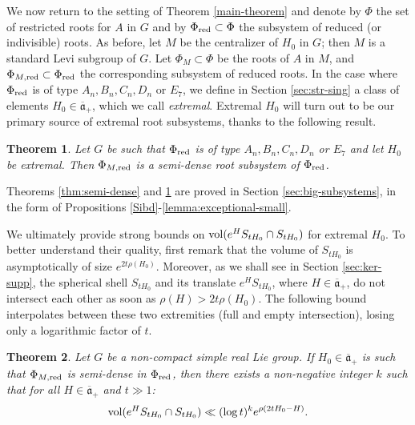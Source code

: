 \documentclass[12pt]{amsart}
\newtheorem{theorem}{Theorem}[section]
\theoremstyle{remark}
\newcommand{\ga}{\mathfrak a}
\begin{document}
We now return to the setting of Theorem \ref{main-theorem} and denote by $\Phi$ the set of restricted roots for $A$ in $G$ and by $\Phi_{\rm red}\subset\Phi$ the subsystem of reduced (or indivisible) roots. As before, let $M$ be the centralizer of $H_0$ in $G$; then $M$ is a standard Levi subgroup of $G$. Let $\Phi_M\subset\Phi$ be the roots of $A$ in $M$, and $\Phi_{M, {\rm red}}\subset\Phi_{\textnormal{red}}$ the corresponding subsystem of reduced roots. In the case where $\Phi_{\rm red}$ is of type $A_n, B_n, C_n, D_n$ or $E_7$, we define in Section \ref{sec:str-sing} a class of elements $H_0\in \overline{\ga}_+$, which we call \textit{extremal}. Extremal $H_0$ will turn out to be our primary source of extremal root subsystems, thanks to the following result.

\begin{theorem}\label{thm:semi-dense2}
Let $G$ be such that $\Phi_{\textnormal{red}}$ is of type $A_n, B_n, C_n, D_n$ or $E_7$ and let $H_0$ be extremal. Then $\Phi_{M,\textnormal{red}}$ is a semi-dense root subsystem of $\Phi_{\rm red}$.
\end{theorem}

Theorems \ref{thm:semi-dense} and \ref{thm:semi-dense2} are proved in Section \ref{sec:big-subsystems}, in the form of Propositions \ref{Sibd}-\ref{lemma:exceptional-small}.

We ultimately provide strong bounds on ${\rm vol}(e^H S_{tH_0} \cap S_{tH_0})$ for extremal $H_0$. To better understand their quality, first remark that the volume of $S_{tH_0}$ is asymptotically of size $e^{2t\rho(H_0)}$. Moreover, as we shall see in Section \ref{sec:ker-supp}, the spherical shell $S_{tH_0}$ and its translate $e^HS_{tH_0}$, where $H\in\overline{\ga}_+$, do not intersect each other as soon as $\rho( H) > 2t\rho(H_0)$. The following bound interpolates between these two extremities (full and empty intersection), losing only a logarithmic factor of $t$.

\begin{theorem} \label{intersection-vol}
Let $G$ be a non-compact simple real Lie group. If $H_0 \in\overline{\mathfrak{a}}_+$ is such that $\Phi_{M,\textnormal{red}}$ is semi-dense in $\Phi_{\textnormal{red}}$, then there exists a non-negative integer $k$ such that for all $H \in \overline{\mathfrak{a}}_+$ and $t \gg 1$: 
    \begin{gather} \label{eqn_vol_bound}
        \textnormal{vol}(e^HS_{t H_0} \cap S_{t H_0}) \ll (\log t)^k e^{\rho(2 t H_0 - H)}.
    \end{gather}
\end{theorem}
\end{document}
